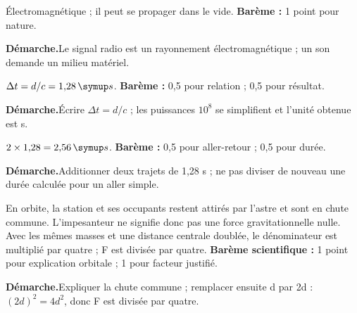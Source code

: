 \par\noindent\begin{minipage}{\linewidth}
Électromagnétique ; il peut se propager dans le vide. \textbf{Barème :} 1 point pour nature.\par
\smallskip\noindent\textbf{Démarche.}\enspace Le signal radio est un rayonnement électromagnétique ; un son demande un milieu matériel.\par
\end{minipage}\par
\par\noindent\begin{minipage}{\linewidth}
$\Delta t=d/c=1{,}28\unite s$. \textbf{Barème :} 0,5 pour relation ; 0,5 pour résultat.\par
\smallskip\noindent\textbf{Démarche.}\enspace Écrire $\Delta t=d/c$ ; les puissances $10^8$ se simplifient et l’unité obtenue est s.\par
\end{minipage}\par
\par\noindent\begin{minipage}{\linewidth}
$2\times1{,}28=2{,}56\unite s$. \textbf{Barème :} 0,5 pour aller-retour ; 0,5 pour durée.\par
\smallskip\noindent\textbf{Démarche.}\enspace Additionner deux trajets de 1,28 s ; ne pas diviser de nouveau une durée calculée pour un aller simple.\par
{}
\end{minipage}\par
\par\noindent\begin{minipage}{\linewidth}
En orbite, la station et ses occupants restent attirés par l’astre et sont en chute commune. L’impesanteur ne signifie donc pas une force gravitationnelle nulle. Avec les mêmes masses et une distance centrale doublée, le dénominateur est multiplié par quatre ; F est divisée par quatre. \textbf{Barème scientifique :} 1 point pour explication orbitale ; 1 pour facteur justifié.\par
\smallskip\noindent\textbf{Démarche.}\enspace Expliquer la chute commune ; remplacer ensuite d par 2d : $(2d)^2=4d^2$, donc F est divisée par quatre.\par
\end{minipage}\par
